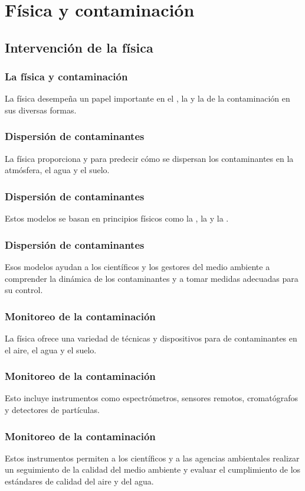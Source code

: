 \documentclass[14pt]{beamer}
\begin{document}
\section{Física y contaminación}
\subsection{Intervención de la física}

\begin{frame}
\frametitle{La física y contaminación}
La física desempeña un papel importante en el , la  y la  de la contaminación en sus diversas formas.
\end{frame}
\begin{frame}
\frametitle{Dispersión de contaminantes}
La física proporciona  y  para predecir cómo se dispersan los contaminantes en la atmósfera, el agua y el suelo.
\end{frame}
\begin{frame}
\frametitle{Dispersión de contaminantes}    
Estos modelos se basan en principios físicos como la , la  y la .
\end{frame}
\begin{frame}
\frametitle{Dispersión de contaminantes}
Esos modelos ayudan a los científicos y los gestores del medio ambiente a comprender la dinámica de los contaminantes y a tomar medidas adecuadas para su control.
\end{frame}
\begin{frame}
\frametitle{Monitoreo de la contaminación}
La física ofrece una variedad de técnicas y dispositivos para  de contaminantes en el aire, el agua y el suelo.
\end{frame}
\begin{frame}
\frametitle{Monitoreo de la contaminación}
Esto incluye instrumentos como espectrómetros, sensores remotos, cromatógrafos y detectores de partículas. 
\end{frame}
\begin{frame}
\frametitle{Monitoreo de la contaminación}
Estos instrumentos permiten a los científicos y a las agencias ambientales realizar un seguimiento de la calidad del medio ambiente y evaluar el cumplimiento de los estándares de calidad del aire y del agua.
\end{frame}
\end{document}
